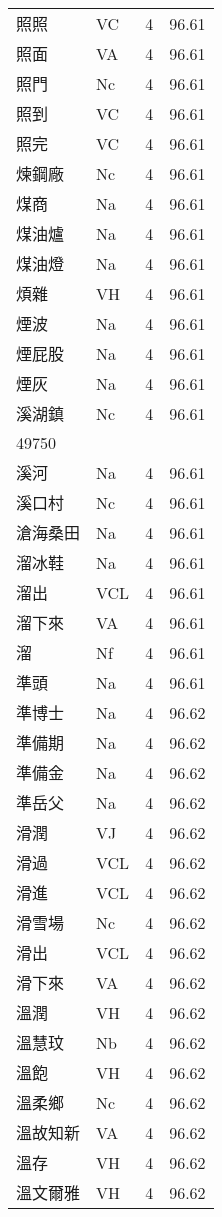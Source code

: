 \documentclass[twocolumn]{book}
\begin{document}
\begin{supertabular}{llrr}
照照 & VC & 4 &  96.61\\
照面 & VA & 4 &  96.61\\
照門 & Nc & 4 &  96.61\\
照到 & VC & 4 &  96.61\\
照完 & VC & 4 &  96.61\\
煉鋼廠 & Nc & 4 &  96.61\\
煤商 & Na & 4 &  96.61\\
煤油爐 & Na & 4 &  96.61\\
煤油燈 & Na & 4 &  96.61\\
煩雜 & VH & 4 &  96.61\\
煙波 & Na & 4 &  96.61\\
煙屁股 & Na & 4 &  96.61\\
煙灰 & Na & 4 &  96.61\\
溪湖鎮 & Nc & 4 &  96.61\\
49750\\
溪河 & Na & 4 &  96.61\\
溪口村 & Nc & 4 &  96.61\\
滄海桑田 & Na & 4 &  96.61\\
溜冰鞋 & Na & 4 &  96.61\\
溜出 & VCL & 4 &  96.61\\
溜下來 & VA & 4 &  96.61\\
溜 & Nf & 4 &  96.61\\
準頭 & Na & 4 &  96.61\\
準博士 & Na & 4 &  96.62\\
準備期 & Na & 4 &  96.62\\
準備金 & Na & 4 &  96.62\\
準岳父 & Na & 4 &  96.62\\
滑潤 & VJ & 4 &  96.62\\
滑過 & VCL & 4 &  96.62\\
滑進 & VCL & 4 &  96.62\\
滑雪場 & Nc & 4 &  96.62\\
滑出 & VCL & 4 &  96.62\\
滑下來 & VA & 4 &  96.62\\
溫潤 & VH & 4 &  96.62\\
溫慧玟 & Nb & 4 &  96.62\\
溫飽 & VH & 4 &  96.62\\
溫柔鄉 & Nc & 4 &  96.62\\
溫故知新 & VA & 4 &  96.62\\
溫存 & VH & 4 &  96.62\\
溫文爾雅 & VH & 4 &  96.62\\

\end{supertabular}
\end{document}
